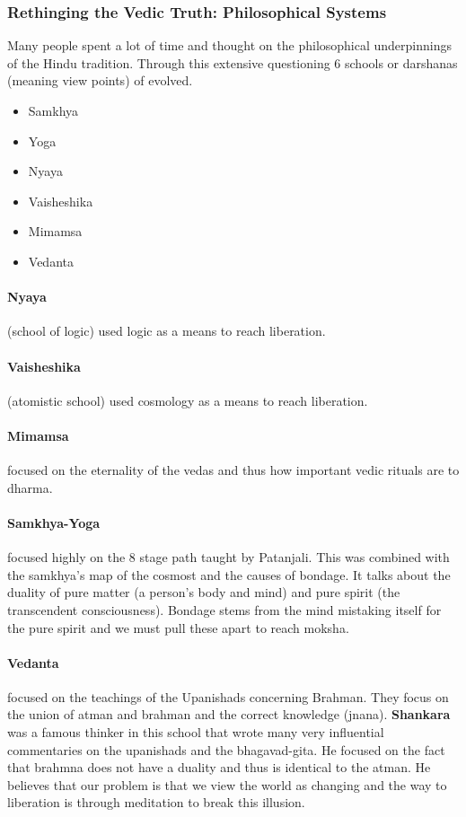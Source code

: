 \documentclass{article}
\begin{document}
\subsubsection*{Rethinging the Vedic Truth: Philosophical Systems}
\label{ssub:rethinging_the_vedic_truth_philosophical_systems}
Many people spent a lot of time and thought on the philosophical underpinnings of the Hindu tradition. Through this extensive questioning 6 schools or darshanas (meaning view points) of evolved.
\begin{itemize}
	\item Samkhya
	\item Yoga
	\item Nyaya
	\item Vaisheshika
	\item Mimamsa
	\item Vedanta
\end{itemize}

\paragraph{Nyaya}
\label{par:nyaya}
(school of logic) used logic as a means to reach liberation.

\paragraph{Vaisheshika}
\label{par:vaisheshika}
(atomistic school) used cosmology as a means to reach liberation.

\paragraph{Mimamsa}
\label{par:mimamsa}
focused on the eternality of the vedas and thus how important vedic rituals are to dharma.

\paragraph{Samkhya-Yoga}
\label{par:samkhya_yoga}
focused highly on the 8 stage path taught by Patanjali. This was combined with the samkhya's map of the cosmost and the causes of bondage. It talks about the duality of pure matter (a person's body and mind) and pure spirit (the transcendent consciousness). Bondage stems from the mind mistaking itself for the pure spirit and we must pull these apart to reach moksha.

\paragraph{Vedanta}
\label{par:vedanta}
focused on the teachings of the Upanishads concerning Brahman. They focus on the union of atman and brahman and the correct knowledge (jnana). \textbf{Shankara} was a famous thinker in this school that wrote many very influential commentaries on the upanishads and the bhagavad-gita. He focused on the fact that brahmna does not have a duality and thus is identical to the atman. He believes that our problem is that we view the world as changing and the way to liberation is through meditation to break this illusion.
\end{document}

